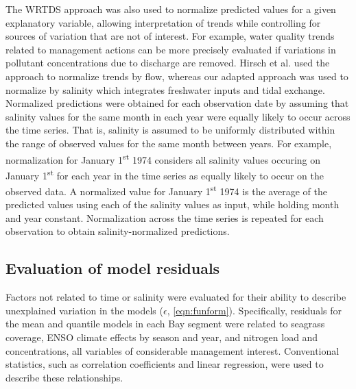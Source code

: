 \documentclass{svjour3}\usepackage[]{graphicx}\usepackage[]{color}
\begin{document}
The \ac{WRTDS} approach was also used to normalize predicted values for a given explanatory variable, allowing interpretation of trends while controlling for sources of variation that are not of interest.  For example, water quality trends related to management actions can be more precisely evaluated if variations in pollutant concentrations due to discharge are removed.  Hirsch et al. \cite{Hirsch10} used the approach to normalize trends by flow, whereas our adapted approach was used to normalize by salinity which integrates freshwater inputs and tidal exchange.  Normalized predictions were obtained for each observation date by assuming that salinity values for the same month in each year were equally likely to occur across the time series.  That is, salinity is assumed to be uniformly distributed within the range of observed values for the same month between years.  For example, normalization for January 1\textsuperscript{st} 1974 considers all salinity values occuring on January 1\textsuperscript{st} for each year in the time series as equally likely to occur on the observed data.  A normalized value for January 1\textsuperscript{st} 1974 is the average of the predicted values using each of the salinity values as input, while holding month and year constant.  Normalization across the time series is repeated for each observation to obtain salinity-normalized predictions.    

\subsection{Evaluation of model residuals}

Factors not related to time or salinity were evaluated for their ability to describe unexplained variation in the models ($\epsilon$, \cref{eqn:funform}). Specifically, residuals for the mean and quantile models in each Bay segment were related to seagrass coverage, \ac{ENSO} climate effects by season and year, and nitrogen load and concentrations, all variables of considerable management interest.  Conventional statistics, such as correlation coefficients and linear regression, were used to describe these relationships.
\end{document}

